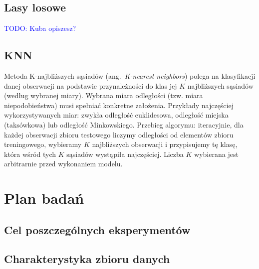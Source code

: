 \documentclass{article}
\newcommand{\TODO}[1]{\textcolor{blue}{TODO: #1}}
\newcommand{\ang}[1]{ang.~{\itshape #1}}
\begin{document}
\subsection{Lasy losowe}
\TODO{Kuba opiszesz?}

\subsection{KNN}
Metoda K-najbliższych sąsiadów (\ang{K-nearest neighbors}) polega na klasyfikacji danej obserwacji na podstawie przynależności do klas jej $K$ najbliższych sąsiadów (według wybranej miary). Wybrana miara odległości (tzw. miara niepodobieństwa) musi spełniać konkretne założenia. Przykłady najczęściej wykorzystywanych miar: zwykła odległość euklidesowa, odległość miejska (taksówkowa) lub odległość Minkowskiego. Przebieg algorymu: iteracyjnie, dla każdej obserwacji zbioru testowego liczymy odległości od elementów zbioru treningowego, wybieramy $K$ najbliższych obserwacji i przypisujemy tę klasę, która wśród tych $K$ sąsiadów wystąpiła najczęściej. Liczba $K$ wybierana jest arbitrarnie przed wykonaniem modelu.

\section{Plan badań}

\subsection{Cel poszczególnych eksperymentów}
\subsection{Charakterystyka zbioru danych}
\end{document}
